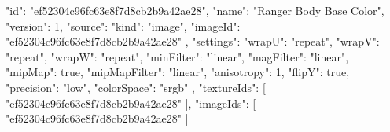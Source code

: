 {
  "id": "ef52304c96fc63e8f7d8cb2b9a42ae28",
  "name": "Ranger Body Base Color",
  "version": 1,
  "source": {
    "kind": "image",
    "imageId": "ef52304c96fc63e8f7d8cb2b9a42ae28"
  },
  "settings": {
    "wrapU": "repeat",
    "wrapV": "repeat",
    "wrapW": "repeat",
    "minFilter": "linear",
    "magFilter": "linear",
    "mipMap": true,
    "mipMapFilter": "linear",
    "anisotropy": 1,
    "flipY": true,
    "precision": "low",
    "colorSpace": "srgb"
  },
  "textureIds": [
    "ef52304c96fc63e8f7d8cb2b9a42ae28"
  ],
  "imageIds": [
    "ef52304c96fc63e8f7d8cb2b9a42ae28"
  ]
}
